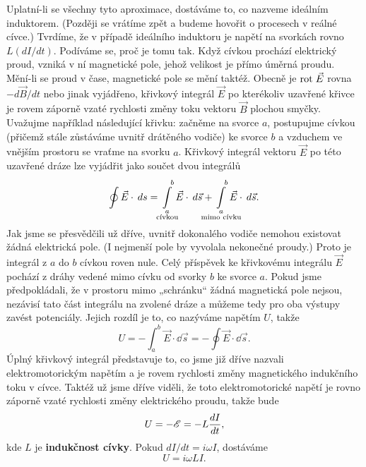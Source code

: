   Uplatní-li se všechny tyto aproximace, dostáváme to, co nazveme ideálním induktorem. (Později se 
  vrátíme zpět a budeme hovořit o procesech v reálné cívce.) Tvrdíme, že v případě ideálního 
  induktoru je napětí na svorkách rovno \(L(dI/dt)\). Podíváme se, proč je tomu tak. Když cívkou 
  prochází elektrický proud, vzniká v ní magnetické pole, jehož velikost je přímo úměrná proudu. 
  Mění-li se proud v čase, magnetické pole se mění taktéž. Obecně je \(\mathrm{rot}\;\vec{E}\) rovna 
  \(-d\vec{B}/dt\) nebo jinak vyjádřeno, křivkový integrál \(\vec{E}\) po kterékoliv uzavřené 
  křivce je rovem záporně vzaté rychlosti změny toku vektoru \(\vec{B}\) plochou smyčky. Uvažujme 
  například následující křivku: začněme na svorce \(a\), postupujme cívkou (přičemž stále zůstáváme 
  uvnitř drátěného vodiče) ke svorce \(b\) a vzduchem ve vnějším prostoru se vraťme na svorku 
  \(a\). Křivkový integrál vektoru \(\vec{E}\) po této uzavřené dráze lze vyjádřit jako součet dvou 
  integrálů
  \begin{equation}\label{fyz:eq468}
   \oint\vec{E}\cdot\dd{s}
     = \limitint_{\mathclap{\substack{a\\\text{cívkou}}}}^{\quad b}\vec{E}\cdot\dd{\vec{s}}
     + \limitint_{\mathclap{\substack{a\\\text{mimo cívku}}}}^{\quad b}\vec{E}\cdot\dd{\vec{s}}.
  \end{equation}
  Jak jsme se přesvědčili už dříve, uvnitř dokonalého vodiče nemohou existovat žádná elektrická 
  pole. (I nejmenší pole by vyvolala nekonečné proudy.) Proto je integrál z \(a\) do \(b\) cívkou 
  roven nule. Celý příspěvek ke křivkovému integrálu \(\vec{E}\) pochází z dráhy vedené mimo cívku 
  od svorky \(b\) ke svorce \(a\). Pokud jsme předpokládali, že v prostoru mimo „schránku“ žádná 
  magnetická pole nejsou, nezávisí tato část integrálu na zvolené dráze a můžeme tedy pro oba 
  výstupy zavést potenciály. Jejich rozdíl je to, co nazýváme napětím \(U\), takže
  \begin{equation}\label{fyz:eq469}
    U = -\int_a^b\vec{E}\cdot\dd{\vec{s}} = - \oint\vec{E}\cdot\dd{\vec{s}}.
  \end{equation}
  Úplný křivkový integrál představuje to, co jsme již dříve nazvali elektromotorickým napětím a je 
  rovem rychlosti změny magnetického indukčního toku v cívce. Taktéž už jsme dříve viděli, že toto 
  elektromotorické napětí je rovno záporně vzaté rychlosti změny elektrického proudu, takže bude
  \begin{equation}\label{fyz:eq470}
    U = -\mathscr{E} = - L\dfrac{d I}{d t},
  \end{equation}
  kde \(L\) je \textbf{indukčnost cívky}. Pokud \(dI/dt = i\omega I\), dostáváme 
  \begin{equation}\label{fyz:eq471}
    U = i\omega LI.
  \end{equation}
  
